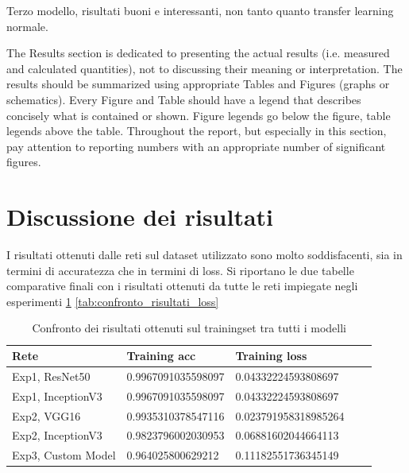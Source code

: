 Terzo modello, risultati buoni e interessanti, non tanto quanto transfer learning normale.


The Results section is dedicated to presenting the actual results (i.e. measured and calculated quantities), not to discussing their meaning or interpretation. The results should be summarized using appropriate Tables and Figures (graphs or schematics). Every Figure and Table should have a legend that describes concisely what is contained or shown. Figure legends go below the figure, table legends above the table. Throughout the report, but especially in this section, pay attention to reporting numbers with an appropriate number of significant figures. 

\section{Discussione dei risultati}

I risultati ottenuti dalle reti sul dataset utilizzato sono molto soddisfacenti, sia in termini di accuratezza che in termini di loss.
Si riportano le due tabelle comparative finali con i risultati ottenuti da tutte le reti impiegate negli esperimenti \ref{tab:confronto_risultati_training} \ref{tab:confronto_risultati_loss}

\begin{table}[H]
    \begin{tabular}{|l|l|l|l|l|}
    \hline
    \textbf{Rete}                         & \textbf{Training acc} & \textbf{Training loss}   \\ \hline
    Exp1, ResNet50     & 0.9967091035598097     & 0.04332224593808697 \\ \hline
    Exp1, InceptionV3  & 0.9967091035598097     & 0.04332224593808697  \\ \hline
    Exp2, VGG16        & 0.9935310378547116     & 0.023791958318985264  \\ \hline
    Exp2, InceptionV3  & 0.9823796002030953     & 0.06881602044664113   \\ \hline
    Exp3, Custom Model & 0.964025800629212      & 0.11182551736345149     \\ \hline
    \end{tabular}
    \caption{\label{tab:confronto_risultati_training}Confronto dei risultati ottenuti sul trainingset tra tutti i modelli}
\end{table}


